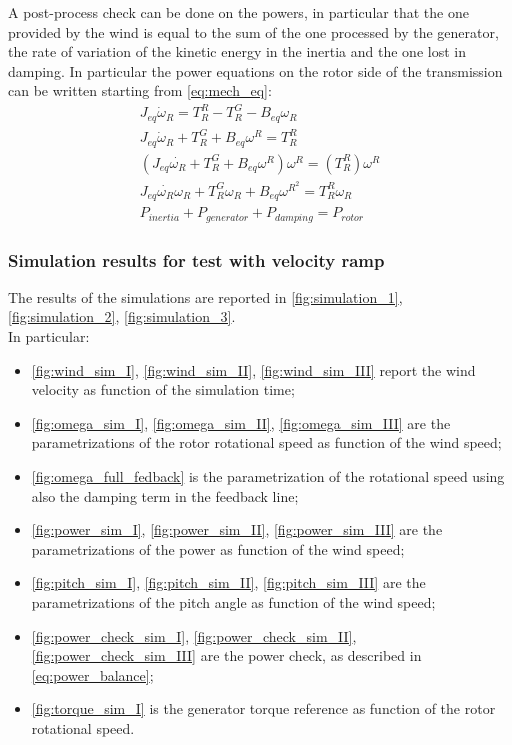 A post-process check can be done on the powers, in particular that the one provided by the wind is equal to the sum of the one processed by the generator, the rate of variation of the kinetic energy in the inertia and the one lost in damping. In particular the power equations on the rotor side of the transmission can be written starting from \autoref{eq:mech_eq}:
\begin{gather}
    J_{eq}\dot{\omega}_{R} = T_R^R - T_R^G-B_{eq}\omega_R\\
    J_{eq}\dot{\omega}_{R} + T_R^G + B_{eq}\omega^R = T_R^R\\
    \left(J_{eq}\dot{\omega_{R}} + T_R^G + B_{eq}\omega^R\right)\omega^R = \left(T_R^R\right)\omega^R\\
    J_{eq}\dot{\omega_{R}}\omega_{R} + T_R^{G}\omega_{R} + B_{eq}\omega^{R^{2}} = T_R^{R}\omega_{R}\\
    P_{inertia} + P_{generator} + P_{damping} = P_{rotor} 
    \label{eq:power_balance}
\end{gather}

\subsubsection[Simulation results]{Simulation results for test with velocity ramp}
The results of the simulations are reported in \autoref{fig:simulation_1}, \ref{fig:simulation_2}, \ref{fig:simulation_3}. \\
In particular:
\begin{itemize}
  \item \autoref{fig:wind_sim_I}, \ref{fig:wind_sim_II}, \ref{fig:wind_sim_III} report the wind velocity as function of the simulation time;
  \item \autoref{fig:omega_sim_I}, \ref{fig:omega_sim_II}, \ref{fig:omega_sim_III} are the parametrizations of the rotor rotational speed as function of the wind speed;
  \item \autoref{fig:omega_full_fedback} is the parametrization of the rotational speed using also the damping term in the feedback line; 
  \item \autoref{fig:power_sim_I}, \ref{fig:power_sim_II}, \ref{fig:power_sim_III} are the parametrizations of the power as function of the wind speed;
  \item \autoref{fig:pitch_sim_I}, \ref{fig:pitch_sim_II}, \ref{fig:pitch_sim_III} are the parametrizations of the pitch angle as function of the wind speed;
  \item \autoref{fig:power_check_sim_I}, \ref{fig:power_check_sim_II}, \ref{fig:power_check_sim_III} are the power check, as described in \autoref{eq:power_balance};
  \item \autoref{fig:torque_sim_I} is the generator torque reference as function of the rotor rotational speed.
\end{itemize}


